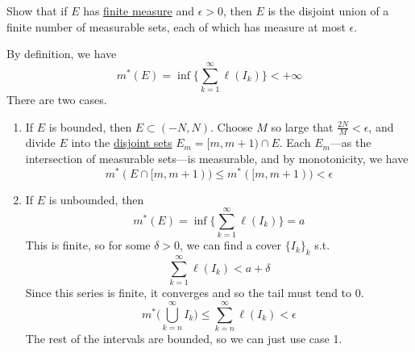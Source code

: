  \begin{exercise}[Royden 2.15]
    Show that if $E$ has \hyperref[def:finite-measure]{finite measure} and $\epsilon > 0$, then $E$ is the disjoint union of a finite number of measurable sets, each of which has measure at most $\epsilon$.
  \end{exercise}
  \begin{solution}
    By definition, we have 
    \begin{equation}
      m^\ast (E) = \inf \bigg\{ \sum_{k=1}^\infty \ell (I_k) \bigg\} < +\infty 
    \end{equation}
    There are two cases. 
    \begin{enumerate}
      \item If $E$ is bounded, then $E \subset (-N, N)$. Choose $M$ so large that $\frac{2N}{M} < \epsilon$, and divide $E$ into the \hyperref[st-def:disjoint-sets]{disjoint sets} $E_m = [m, m+1) \cap E$. Each $E_m$---as the intersection of measurable sets---is measurable, and by monotonicity, we have 
      \begin{equation}
        m^\ast (E \cap [m, m+1)) \leq m^\ast ([m, m+1)) < \epsilon
      \end{equation}

      \item If $E$ is unbounded, then 
        \begin{equation}
          m^\ast (E) = \inf \bigg\{ \sum_{k=1}^\infty \ell(I_k) \bigg\} = a 
        \end{equation}
        This is finite, so for some $\delta > 0$, we can find a cover $\{I_k\}_k$ s.t. 
        \begin{equation}
          \sum_{k=1}^\infty \ell(I_k) < a + \delta 
        \end{equation}
        Since this series is finite, it converges and so the tail must tend to $0$. 
        \begin{equation}
          m^\ast \bigg( \bigcup_{k=n}^\infty I_k \bigg) \leq \sum_{k=n}^\infty \ell (I_k) < \epsilon
        \end{equation}
        The rest of the intervals are bounded, so we can just use case 1. 
    \end{enumerate}
  \end{solution}

